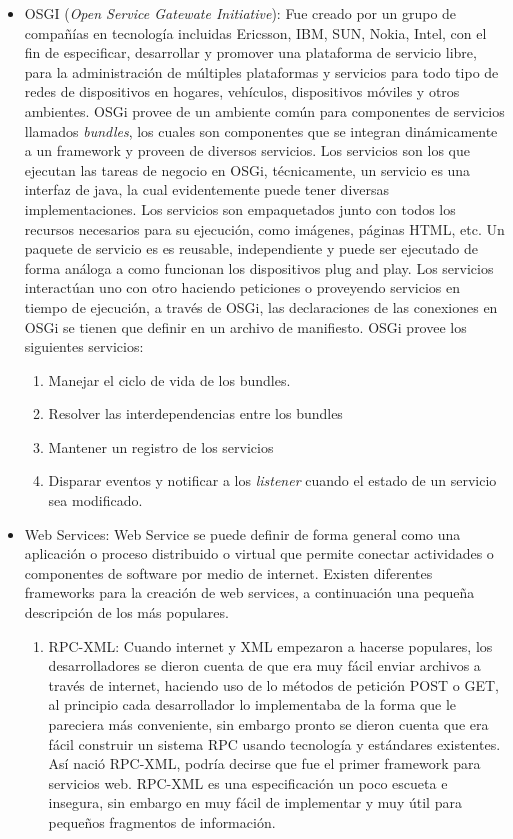 \documentclass[12pt,a4paper,spanish,openany]{book}
\begin{document}
\begin{itemize}
\item OSGI (\emph{Open Service Gatewate Initiative}): Fue creado por un grupo
de compañías en tecnología incluidas Ericsson, IBM, SUN, Nokia, Intel, con el
fin de especificar, desarrollar y promover una plataforma de servicio libre,
para la administración de múltiples plataformas y servicios para todo tipo de
redes de dispositivos en hogares, vehículos, dispositivos móviles y otros
ambientes. OSGi provee de un ambiente común para componentes de servicios
llamados \emph{bundles}, los cuales son componentes que se integran
dinámicamente a un framework y proveen de diversos servicios. Los
servicios son los que ejecutan las tareas de negocio en OSGi, técnicamente, un
servicio es una interfaz de java, la cual evidentemente puede tener diversas
implementaciones. Los servicios son empaquetados junto con todos los recursos
necesarios para su ejecución, como imágenes, páginas HTML, etc. Un paquete de
servicio es es reusable, independiente y puede ser ejecutado de forma análoga
a como funcionan los dispositivos plug and play. Los servicios interactúan uno
con otro haciendo peticiones o proveyendo servicios en tiempo de ejecución, a
través de OSGi, las declaraciones de las conexiones en OSGi se tienen que
definir en un archivo de manifiesto.
OSGi provee los siguientes servicios:
\begin{enumerate}
  \item Manejar el ciclo de vida de los bundles.
  \item Resolver las interdependencias entre los bundles
  \item Mantener un registro de los servicios
  \item Disparar eventos y notificar a los \emph{listener} cuando el estado de
  un servicio sea modificado.
\end{enumerate}


\item Web Services: 
Web Service se puede definir de forma general como una aplicación o proceso
distribuido o virtual que permite conectar actividades o componentes de software
por medio de internet.
Existen diferentes frameworks para la creación de web services, a
continuación una pequeña descripción de los más populares.


\begin{enumerate}
  \item RPC-XML: Cuando internet y XML empezaron a hacerse populares, los desarrolladores se
  dieron cuenta de que era muy fácil enviar archivos a través de
  internet, haciendo uso de lo métodos de petición \gls{POST} o \gls{GET}, al
  principio cada desarrollador lo implementaba de la forma que le pareciera
  más conveniente, sin embargo pronto se dieron cuenta que era fácil construir
  un sistema \gls{RPC} usando tecnología y estándares existentes. Así nació
  RPC-XML, podría decirse que fue el primer \gls{framework}
  para servicios web. RPC-XML es una especificación un poco escueta e insegura,
  sin embargo en muy fácil de implementar y muy útil para pequeños fragmentos de
  información.
  

\end{enumerate}
\end{itemize}
\end{document}
